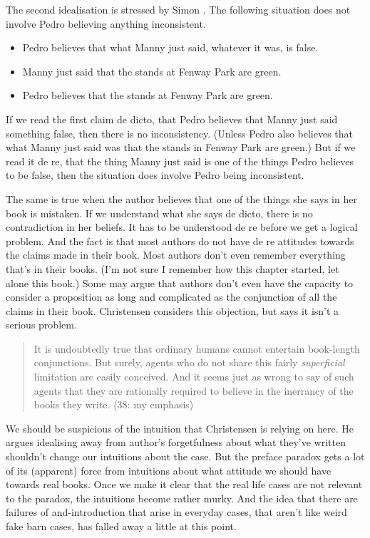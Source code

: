 \documentclass[11pt,]{book}
\providecommand{\tightlist}{%
  \setlength{\itemsep}{0pt}\setlength{\parskip}{0pt}}
\begin{document}
The second idealisation is stressed by Simon \citet{Evnine1999}. The following situation does not involve Pedro believing anything inconsistent.

\begin{itemize}
\tightlist
\item
  Pedro believes that what Manny just said, whatever it was, is false.
\item
  Manny just said that the stands at Fenway Park are green.
\item
  Pedro believes that the stands at Fenway Park are green.
\end{itemize}

If we read the first claim de dicto, that Pedro believes that Manny just said something false, then there is no inconsistency. (Unless Pedro also believes that what Manny just said was that the stands in Fenway Park are green.) But if we read it de re, that the thing Manny just said is one of the things Pedro believes to be false, then the situation does involve Pedro being inconsistent.

The same is true when the author believes that one of the things she says in her book is mistaken. If we understand what she says de dicto, there is no contradiction in her beliefs. It has to be understood de re before we get a logical problem. And the fact is that most authors do not have de re attitudes towards the claims made in their book. Most authors don't even remember everything that's in their books. (I'm not sure I remember how this chapter started, let alone this book.) Some may argue that authors don't even have the capacity to consider a proposition as long and complicated as the conjunction of all the claims in their book. Christensen considers this objection, but says it isn't a serious problem.

\begin{quote}
It is undoubtedly true that ordinary humans cannot entertain book-length conjunctions. But surely, agents who do not share this fairly \emph{superficial} limitation are easily conceived. And it seems just as wrong to say of such agents that they are rationally required to believe in the inerrancy of the books they write. (38: my emphasis)
\end{quote}

We should be suspicious of the intuition that Christensen is relying on here. He argues idealising away from author's forgetfulness about what they've written shouldn't change our intuitions about the case. But the preface paradox gets a lot of its (apparent) force from intuitions about what attitude we should have towards real books. Once we make it clear that the real life cases are not relevant to the paradox, the intuitions become rather murky. And the idea that there are failures of and-introduction that arise in everyday cases, that aren't like weird fake barn cases, has falled away a little at this point.
\end{document}
